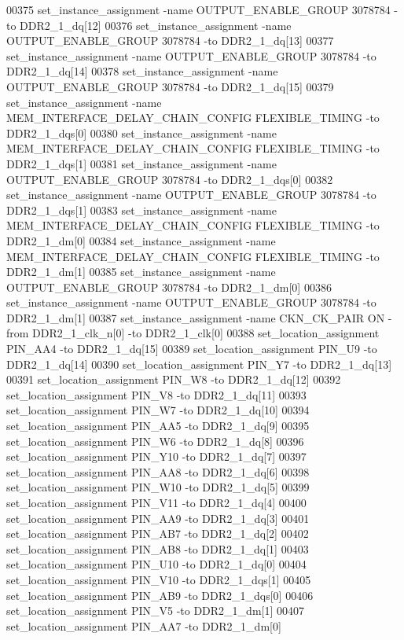 \begin{DoxyCode}
00375 set\_instance\_assignment -name OUTPUT\_ENABLE\_GROUP \textcolor{vhdllogic}{3078784} -to DDR2\_1\_dq[12]
00376 set\_instance\_assignment -name OUTPUT\_ENABLE\_GROUP \textcolor{vhdllogic}{3078784} -to DDR2\_1\_dq[13]
00377 set\_instance\_assignment -name OUTPUT\_ENABLE\_GROUP \textcolor{vhdllogic}{3078784} -to DDR2\_1\_dq[14]
00378 set\_instance\_assignment -name OUTPUT\_ENABLE\_GROUP \textcolor{vhdllogic}{3078784} -to DDR2\_1\_dq[15]
00379 set\_instance\_assignment -name MEM\_INTERFACE\_DELAY\_CHAIN\_CONFIG FLEXIBLE\_TIMING -to DDR2\_1\_dqs[0]
00380 set\_instance\_assignment -name MEM\_INTERFACE\_DELAY\_CHAIN\_CONFIG FLEXIBLE\_TIMING -to DDR2\_1\_dqs[1]
00381 set\_instance\_assignment -name OUTPUT\_ENABLE\_GROUP \textcolor{vhdllogic}{3078784} -to DDR2\_1\_dqs[0]
00382 set\_instance\_assignment -name OUTPUT\_ENABLE\_GROUP \textcolor{vhdllogic}{3078784} -to DDR2\_1\_dqs[1]
00383 set\_instance\_assignment -name MEM\_INTERFACE\_DELAY\_CHAIN\_CONFIG FLEXIBLE\_TIMING -to DDR2\_1\_dm[0]
00384 set\_instance\_assignment -name MEM\_INTERFACE\_DELAY\_CHAIN\_CONFIG FLEXIBLE\_TIMING -to DDR2\_1\_dm[1]
00385 set\_instance\_assignment -name OUTPUT\_ENABLE\_GROUP \textcolor{vhdllogic}{3078784} -to DDR2\_1\_dm[0]
00386 set\_instance\_assignment -name OUTPUT\_ENABLE\_GROUP \textcolor{vhdllogic}{3078784} -to DDR2\_1\_dm[1]
00387 set\_instance\_assignment -name CKN\_CK\_PAIR \textcolor{keywordflow}{ON} -from DDR2\_1\_clk\_n[0] -to DDR2\_1\_clk[0]
00388 set\_location\_assignment PIN\_AA4 -to DDR2\_1\_dq[15]
00389 set\_location\_assignment PIN\_U9 -to DDR2\_1\_dq[14]
00390 set\_location\_assignment PIN\_Y7 -to DDR2\_1\_dq[13]
00391 set\_location\_assignment PIN\_W8 -to DDR2\_1\_dq[12]
00392 set\_location\_assignment PIN\_V8 -to DDR2\_1\_dq[11]
00393 set\_location\_assignment PIN\_W7 -to DDR2\_1\_dq[10]
00394 set\_location\_assignment PIN\_AA5 -to DDR2\_1\_dq[9]
00395 set\_location\_assignment PIN\_W6 -to DDR2\_1\_dq[8]
00396 set\_location\_assignment PIN\_Y10 -to DDR2\_1\_dq[7]
00397 set\_location\_assignment PIN\_AA8 -to DDR2\_1\_dq[6]
00398 set\_location\_assignment PIN\_W10 -to DDR2\_1\_dq[5]
00399 set\_location\_assignment PIN\_V11 -to DDR2\_1\_dq[4]
00400 set\_location\_assignment PIN\_AA9 -to DDR2\_1\_dq[3]
00401 set\_location\_assignment PIN\_AB7 -to DDR2\_1\_dq[2]
00402 set\_location\_assignment PIN\_AB8 -to DDR2\_1\_dq[1]
00403 set\_location\_assignment PIN\_U10 -to DDR2\_1\_dq[0]
00404 set\_location\_assignment PIN\_V10 -to DDR2\_1\_dqs[1]
00405 set\_location\_assignment PIN\_AB9 -to DDR2\_1\_dqs[0]
00406 set\_location\_assignment PIN\_V5 -to DDR2\_1\_dm[1]
00407 set\_location\_assignment PIN\_AA7 -to DDR2\_1\_dm[0]

\end{DoxyCode}
